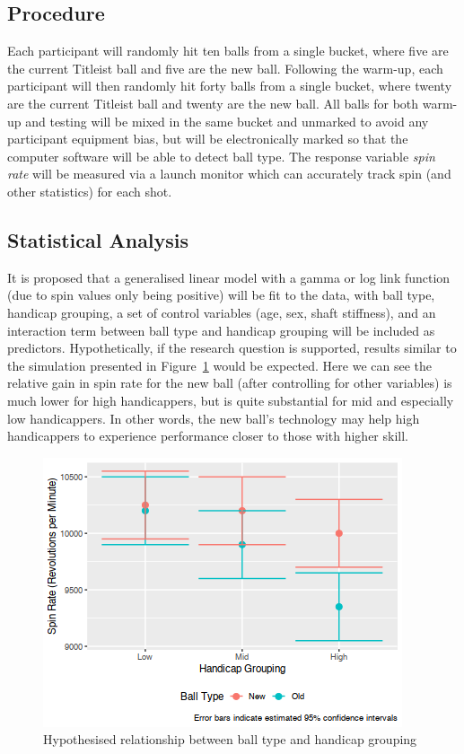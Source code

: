 \documentclass{article}
\begin{document}
\subsection*{Procedure}

Each participant will randomly hit ten balls from a single bucket, where five are the current Titleist ball and five are the new ball. 
Following the warm-up, each participant will then randomly hit forty balls from a single bucket, where twenty are the current Titleist ball and twenty are the new ball.
All balls for both warm-up and testing will be mixed in the same bucket and unmarked to avoid any participant equipment bias, but will be electronically marked so that the computer software will be able to detect ball type. 
The response variable \textit{spin rate} will be measured via a launch monitor which can accurately track spin (and other statistics) for each shot.

\subsection*{Statistical Analysis}

It is proposed that a generalised linear model with a gamma or log link function (due to spin values only being positive) will be fit to the data, with ball type, handicap grouping, a set of control variables (age, sex, shaft stiffness), and an interaction term between ball type and handicap grouping will be included as predictors. 
Hypothetically, if the research question is supported, results similar to the simulation presented in Figure~\ref{fig:expectations} would be expected.
Here we can see the relative gain in spin rate for the new ball (after controlling for other variables) is much lower for high handicappers, but is quite substantial for mid and especially low handicappers. 
In other words, the new ball's technology may help high handicappers to experience performance closer to those with higher skill.

\begin{figure}[h]
    \centering
    \includegraphics[max width=\linewidth, scale=0.53]{expectations}
    \caption{\label{fig:expectations}Hypothesised relationship between ball type and handicap grouping}
\end{figure}
\end{document}
